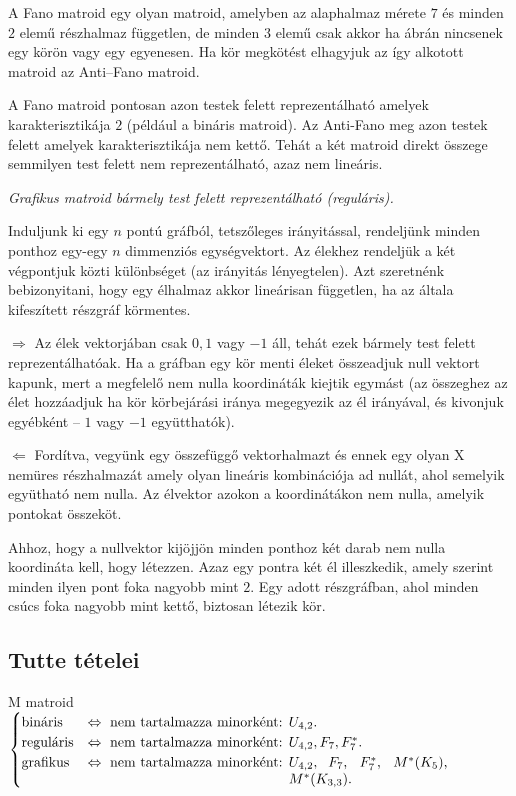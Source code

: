 A Fano matroid egy olyan matroid, amelyben az alaphalmaz mérete $7$ és minden
$2$ elemű részhalmaz független, de minden $3$ elemű csak akkor ha
 ábrán nincsenek egy körön vagy egy egyenesen. Ha kör megkötést
elhagyjuk az így alkotott matroid az Anti--Fano matroid.

A Fano matroid pontosan azon testek felett reprezentálható amelyek
karakterisztikája $2$ (például a bináris matroid). Az Anti-Fano meg azon testek
felett amelyek karakterisztikája nem kettő. Tehát a két matroid direkt összege
semmilyen test felett nem reprezentálható, azaz nem lineáris.

\vspace{0.4cm}
\emph{Grafikus matroid bármely test felett reprezentálható (reguláris).}
\vspace{0.4cm}

Induljunk ki egy $n$ pontú gráfból, tetszőleges irányitással, rendeljünk minden
ponthoz egy-egy $n$ dimmenziós egységvektort. Az élekhez rendeljük a két
végpontjuk közti különbséget (az irányitás lényegtelen). Azt szeretnénk
bebizonyitani, hogy egy élhalmaz akkor lineárisan független, ha az általa
kifeszített részgráf körmentes.

$\Rightarrow$  Az élek vektorjában csak $0,1$ vagy $-1$ áll, tehát ezek bármely
test felett reprezentálhatóak. Ha a gráfban egy kör menti éleket összeadjuk null vektort
kapunk, mert a megfelelő nem nulla koordináták kiejtik egymást (az összeghez az
élet hozzáadjuk ha kör körbejárási iránya megegyezik az él irányával, és
kivonjuk egyébként -- $1$ vagy $-1$ együtthatók).

$\Leftarrow$ Fordítva, vegyünk egy összefüggő vektorhalmazt és ennek egy olyan X
nemüres részhalmazát amely olyan lineáris kombinációja ad nullát, ahol semelyik
együtható nem nulla. Az élvektor azokon a koordinátákon nem nulla, amelyik
pontokat összeköt.

Ahhoz, hogy a nullvektor kijöjjön minden ponthoz két darab nem nulla koordináta
kell, hogy létezzen. Azaz egy pontra két él illeszkedik, amely szerint minden
ilyen pont foka nagyobb mint $2$.  Egy adott részgráfban, ahol minden csúcs foka
nagyobb mint kettő, biztosan létezik kör.

\subsection{Tutte tételei}

M matroid $\begin{cases}
	\mbox{bináris} &\Leftrightarrow \mbox{ nem tartalmazza minorként: } U_{4,2}. \\
	\mbox{reguláris} &\Leftrightarrow \mbox{ nem tartalmazza minorként: } U_{4,2}, F_7, F_7^*. \\
	\mbox{grafikus} &\Leftrightarrow \mbox{ nem tartalmazza minorként: } \parbox[t]{4cm}{
$U_{4,2},$ $F_7$, $F_7^*$, $M^*(K_5)$, $M^*(K_{3,3})$.} \\
	\end{cases}$

